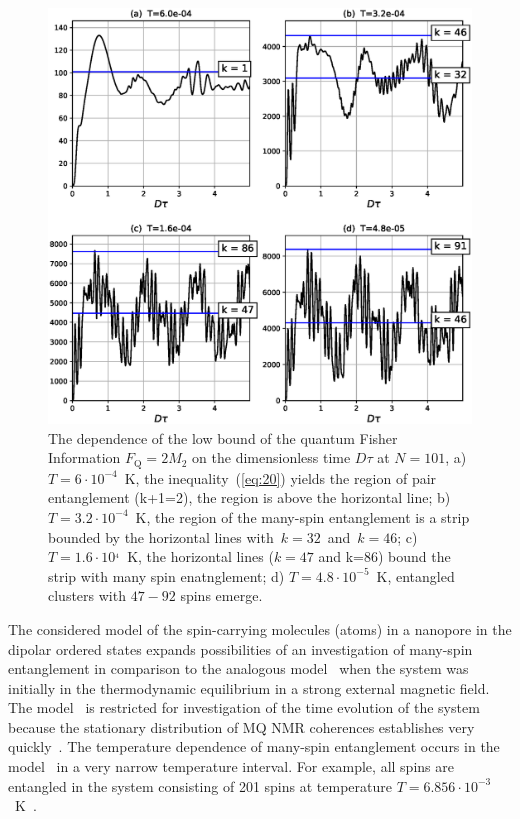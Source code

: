 \documentclass[review]{elsarticle}
\begin{document}
\begin{figure}
  	\includegraphics[width=0.95\linewidth]{fisher_low_bound_n101.eps}
	\caption{
	    The dependence of the low bound of the quantum Fisher Information $F_\mathrm{Q} = 2 M_{2}$ 
	    on the dimensionless time $D\tau$ at $N=101$, 
	    a) $T=6\cdot10^{-4}$~K, the inequality~(\ref{eq:20}) yields the region of pair entanglement (k+1=2), the region is above the horizontal line; 
	    b) $T=3.2\cdot10^{-4}$~K, the region of the many-spin entanglement is a strip bounded by the horizontal lines with~$k=32$~and~$k=46$; 
	    c) $T = 1.6\cdot10^{_4}$~K, the horizontal lines ($k=47$ and k=$86$) bound the strip with many spin enatnglement;
	    d) $T=4.8\cdot10^{-5}$~K, entangled clusters with $47-92$ spins emerge.
	}
	\label{fig:2}
\end{figure}

The considered model of the spin-carrying molecules (atoms) in a nanopore in the dipolar ordered states expands possibilities of an investigation of many-spin entanglement in comparison to the analogous model~\cite{Doronin_2019}
when the system was initially in the thermodynamic equilibrium in a strong external magnetic field.
The model~\cite{Doronin_2019}  is restricted for investigation of the time evolution of the system
because the stationary distribution of MQ NMR coherences establishes very quickly~\cite{Doronin_2009}.
The temperature dependence of many-spin entanglement occurs in the model~\cite{Doronin_2019} in a very narrow temperature interval.
For example, all spins are entangled in the system consisting of 201 spins at temperature $T=6.856\cdot10^{-3}$~K~\cite{Doronin_2019}.
\end{document}
